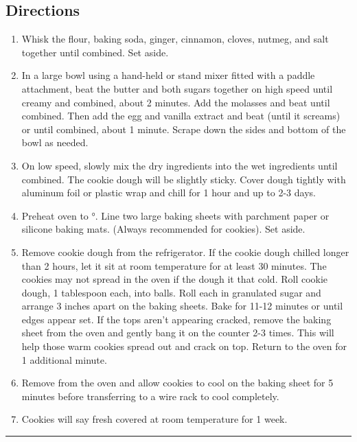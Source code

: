 \documentclass[
]{book}
\providecommand{\tightlist}{%
  \setlength{\itemsep}{0pt}\setlength{\parskip}{0pt}}
\begin{document}
\hypertarget{directions-94}{%
\subsection*{Directions}\label{directions-94}}


\begin{enumerate}
\def\labelenumi{\arabic{enumi}.}
\tightlist
\item
  Whisk the flour, baking soda, ginger, cinnamon, cloves, nutmeg, and salt together until combined. Set aside.
\item
  In a large bowl using a hand-held or stand mixer fitted with a paddle attachment, beat the butter and both sugars together on high speed until creamy and combined, about 2 minutes. Add the molasses and beat until combined. Then add the egg and vanilla extract and beat (until it screams) or until combined, about 1 minute. Scrape down the sides and bottom of the bowl as needed.
\item
  On low speed, slowly mix the dry ingredients into the wet ingredients until combined. The cookie dough will be slightly sticky. Cover dough tightly with aluminum foil or plastic wrap and chill for 1 hour and up to 2-3 days.
\item
  Preheat oven to °. Line two large baking sheets with parchment paper or silicone baking mats. (Always recommended for cookies). Set aside.
\item
  Remove cookie dough from the refrigerator. If the cookie dough chilled longer than 2 hours, let it sit at room temperature for at least 30 minutes. The cookies may not spread in the oven if the dough it that cold. Roll cookie dough, 1 tablespoon each, into balls. Roll each in granulated sugar and arrange 3 inches apart on the baking sheets. Bake for 11-12 minutes or until edges appear set. If the tops aren't appearing cracked, remove the baking sheet from the oven and gently bang it on the counter 2-3 times. This will help those warm cookies spread out and crack on top. Return to the oven for 1 additional minute.
\item
  Remove from the oven and allow cookies to cool on the baking sheet for 5 minutes before transferring to a wire rack to cool completely.
\item
  Cookies will say fresh covered at room temperature for 1 week.
\end{enumerate}

\begin{center}\rule{0.5\linewidth}{0.5pt}\end{center}
\end{document}
